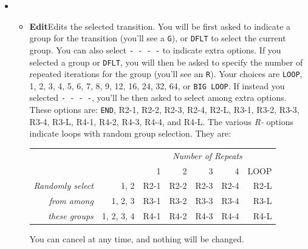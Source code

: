 \documentclass{article}
\begin{document}
\begin{itemize}
\item[]~\vspace{-2em}
\begin{itemize}
	\item {\bf Edit}\quad Edits the selected transition.  You will be first asked to indicate a group for the transition (you'll see a \texttt{G}), or \texttt{DFLT} to select the current group.  You can also select \texttt{- - - -} to indicate extra options.  If you selected a group or \texttt{DFLT}, you will then be asked to specify the number of repeated iterations for the group (you'll see an \texttt{R}).  Your choices are \texttt{LOOP}, 1, 2, 3, 4, 5, 6, 7, 8, 9, 12, 16, 24, 32, 64, or \texttt{BIG LOOP}.  If instead you selected \texttt{- - - -}, you'll be then asked to select among extra options.  These options are: \texttt{END}, R2-1, R2-2, R2-3, R2-4, R2-L, R3-1, R3-2, R3-3, R3-4, R3-L, R4-1, R4-2, R4-3, R4-4, and R4-L.  The various {\it R-} options indicate loops with random group selection. They are:

\vspace{-1em}
\begin{center}
\begin{tabular}{r@{~~~}r|rrrrr}
		&&\multicolumn{5}{c}{\it Number of Repeats}\\
				&&1&2&3&4&LOOP\\
				\hline
		\it Randomly select&1, 2&R2-1&R2-2&R2-3&R2-4&R2-L\\
		 \it from among &1, 2, 3&R3-1&R3-2&R3-3&R3-4&R3-L\\
		\it these groups&1, 2, 3, 4&R4-1&R4-2&R4-3&R4-4&R4-L\\
\end{tabular}
\end{center}

You can cancel at any time, and nothing will be changed.
	  

\end{itemize}
\end{itemize}
\end{document}
